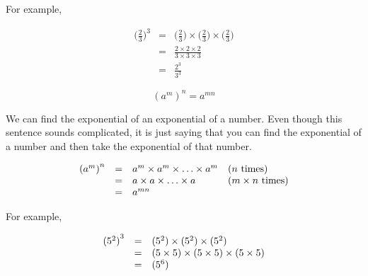 For example,

\begin{eqnarray*}

\Big(\frac{2}{3}\Big)^3 & = & \Big(\frac{2}{3}\Big) \times  \Big(\frac{2}{3}\Big) \times \Big(\frac{2}{3}\Big) \\
                        & = & \frac{2 \times 2 \times 2}{3 \times 3 \times 3} \\
		        & = & \frac{2^3}{3^3}

\end{eqnarray*}


{
$$ {({a}^{m})}^{n}={a}^{mn} $$

We can find the exponential of an exponential of a number. Even though this sentence sounds complicated, it is just saying that you can find the exponential of a number and then take the exponential of that number. \par


\begin{equation*}
    \begin{array}{ccll}\hfill {({a}^{m})}^{n}& =& {a}^{m}  \times {a}^{m}  \times \ldots  \times {a}^{m}\hfill & (\mbox{$n$ times})\hfill \\
	\hfill & =& a  \times a  \times \ldots  \times a\hfill & ({m}  \times \mbox{$n$ times})\hfill \\
	\hfill & =& {a}^{mn}\hfill & 
    \end{array}
\end{equation*}

}
For example,

\begin{equation*}
    \begin{array}{ccl}\hfill {({5}^{2})}^{3}& =& ({5}^{2})  \times ({5}^{2})  \times ({5}^{2})\hfill \\ 
	      & =& (5  \times 5)  \times (5  \times 5)  \times (5  \times 5)\hfill \\
	      & =& ({5}^{6})\hfill
    \end{array}
\end{equation*}



